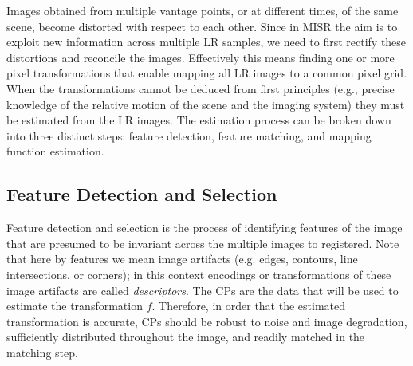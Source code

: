 
Images obtained from multiple vantage points, or at different times, of the same scene, become distorted with respect to each other.
%
Since in MISR the aim is to exploit new information across multiple LR samples, we need to first rectify these distortions and reconcile the images.
%
Effectively this means finding one or more pixel transformations that enable mapping all LR images to a common pixel grid.
%
When the transformations cannot be deduced from first principles (e.g., precise knowledge of the relative motion of the scene and the imaging system) they must be estimated from the LR images.
%
The estimation process can be broken down into three distinct steps: feature detection, feature matching, and mapping function estimation.

\subsection{Feature Detection and Selection}

Feature detection and selection is the process of identifying features of the image that are presumed to be invariant across the multiple images to registered.
%
Note that here by features we mean image artifacts (e.g. edges, contours, line intersections, or corners); in this context encodings or transformations of these image artifacts are called \textit{descriptors}.
%
The CPs are the data that will be used to estimate the transformation \(f\).
%
Therefore, in order that the estimated transformation is accurate, CPs should be robust to noise and image degradation, sufficiently distributed throughout the image, and readily matched in the matching step.

